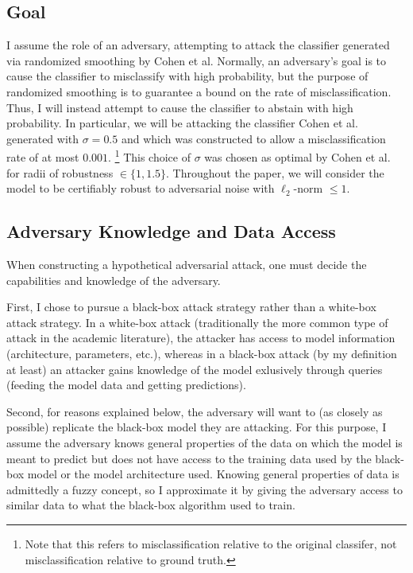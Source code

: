 \documentclass{article}
\begin{document}
\subsection{Goal}
I assume the role of an adversary, attempting to attack the classifier generated via randomized smoothing by Cohen et al. Normally, an adversary's goal is to cause the classifier to misclassify with high probability, but the purpose of randomized smoothing is to guarantee a bound on the rate of misclassification. Thus, I will instead attempt to cause the classifier to abstain with high probability. In particular, we will be attacking the classifier Cohen et al. generated with $\sigma = 0.5$ and which was constructed to allow a misclassification rate of at most $0.001$. \footnote{Note that this refers to misclassification relative to the original classifer, not misclassification relative to ground truth.} This choice of $\sigma$ was chosen as optimal by Cohen et al. for radii of robustness $\in \{1, 1.5\}$. Throughout the paper, we will consider the model to be certifiably robust to adversarial noise with $\ell_2$-norm $\leq 1$.

\subsection{Adversary Knowledge and Data Access}
When constructing a hypothetical adversarial attack, one must decide the capabilities and knowledge of the adversary. \newline

First, I chose to pursue a black-box attack strategy rather than a white-box attack strategy. In a white-box attack (traditionally the more common type of attack in the academic literature), the attacker has access to model information (architecture, parameters, etc.), whereas in a black-box attack (by my definition at least) an attacker gains knowledge of the model exlusively through queries (feeding the model data and getting predictions). \newline

Second, for reasons explained below, the adversary will want to (as closely as possible) replicate the black-box model they are attacking. For this purpose, I assume the adversary knows general properties of the data on which the model is meant to predict but does not have access to the training data used by the black-box model or the model architecture used. Knowing general properties of data is admittedly a fuzzy concept, so I approximate it by giving the adversary access to similar data to what the black-box algorithm used to train. \newline
\end{document}

